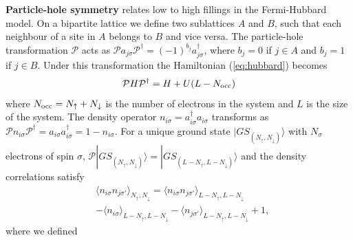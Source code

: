 \documentclass[aps,prb,twoside,superscriptaddress,longbibliography,nofootinbib,floatfix, notitlepage,twocolumn]{revtex4-1}
\newcommand{\Nocc}{N_{\rm{occ}}}
\begin{document}
\textbf{Particle-hole symmetry} relates low to high fillings in the Fermi-Hubbard model.
On a bipartite lattice we define two sublattices $A$ and $B$, such that each neighbour of a site in $A$ belongs to $B$ and vice versa. The particle-hole transformation $\mathcal{P}$ acts as $\mathcal{P}a_{j\sigma}\mathcal{P}^{\dagger}=(-1)^{b_{j}}a_{j\sigma}^{\dagger}$, where $b_{j}=0$ if $j\in A$ and $b_{j}=1$ if $j\in B$. Under this transformation the Hamiltonian (\ref{eq:hubbard}) becomes
\begin{equation}
\mathcal{P}H\mathcal{P}^{\dagger}	=H+U(L-\Nocc)
\end{equation}
where $\Nocc=N_{\uparrow}+N_{\downarrow}$ is the number of electrons in the system and $L$ is the size of the system. The density operator $n_{i\sigma}=a_{i\sigma}^{\dagger}a_{i\sigma}$ transforms as $\mathcal{P}n_{i\sigma}\mathcal{P}^{\dagger}=a_{i\sigma}a_{i\sigma}^{\dagger}=1-n_{i\sigma}$. For a unique ground state $|GS_{(N_{\uparrow},N_{\downarrow})}\rangle$ with $N_\sigma$ electrons of spin $\sigma$, $\mathcal{P}|GS_{(N_{\uparrow},N_{\downarrow})}\rangle=|GS_{(L-N_{\uparrow},L-N_{\downarrow})}\rangle$ and the density correlations satisfy
\begin{eqnarray}\nonumber\label{eq:PH_corr}
&\langle n_{i\sigma}n_{j\sigma'}\rangle_{N_{\uparrow},N_{\downarrow}}=\langle n_{i\sigma}n_{j\sigma'}\rangle_{L-N_{\uparrow},L-N_{\downarrow}}\\
&-\langle n_{i\sigma}\rangle_{L-N_{\uparrow},L-N_{\downarrow}}-\langle n_{j\sigma'}\rangle_{L-N_{\uparrow},L-N_{\downarrow}}+1,
\end{eqnarray}
where we defined
\end{document}
